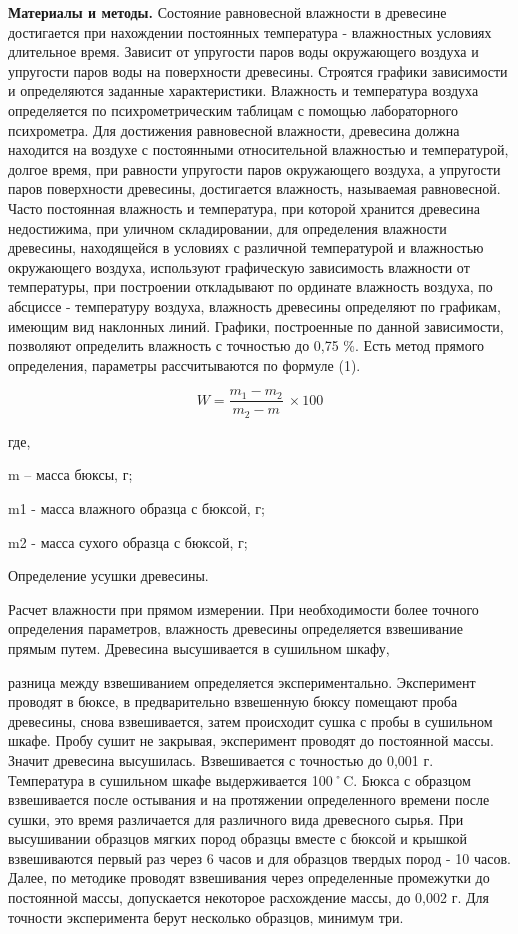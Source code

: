 \begin{multicols}{2}
{\bfseries Материалы и методы.} Состояние равновесной влажности в древесине
достигается при нахождении постоянных температура - влажностных условиях
длительное время. Зависит от упругости паров воды окружающего воздуха и
упругости паров воды на поверхности древесины. Строятся графики
зависимости и определяются заданные характеристики. Влажность и
температура воздуха определяется по психрометрическим таблицам с помощью
лабораторного психрометра. Для достижения равновесной влажности,
древесина должна находится на воздухе с постоянными относительной
влажностью и температурой, долгое время, при равности упругости паров
окружающего воздуха, а упругости паров поверхности древесины,
достигается влажность, называемая равновесной. Часто постоянная
влажность и температура, при которой хранится древесина недостижима, при
уличном складировании, для определения влажности древесины, находящейся
в условиях с различной температурой и влажностью окружающего воздуха,
используют графическую зависимость влажности от температуры, при
построении откладывают по ординате влажность воздуха, по абсциссе -
температуру воздуха, влажность древесины определяют по графикам, имеющим
вид наклонных линий. Графики, построенные по данной зависимости,
позволяют определить влажность с точностью до 0,75 \%. Есть метод
прямого определения, параметры рассчитываются по формуле (1).

\begin{equation}
W = \frac{m_{1} - m_{2}}{m_{2} - m}\  \times 100
\end{equation}

где,

m -- масса бюксы, г;

m1 - масса влажного образца с бюксой, г;

m2 - масса сухого образца с бюксой, г;

Определение усушки древесины.

Расчет влажности при прямом измерении. При необходимости более точного
определения параметров, влажность древесины определяется взвешивание
прямым путем. Древесина высушивается в сушильном шкафу,

разница между взвешиванием определяется экспериментально. Эксперимент
проводят в бюксе, в предварительно взвешенную бюксу помещают проба
древесины, снова взвешивается, затем происходит сушка с пробы в
сушильном шкафе. Пробу сушит не закрывая, эксперимент проводят до
постоянной массы. Значит древесина высушилась. Взвешивается с точностью
до 0,001 г. Температура в сушильном шкафе выдерживается 100˚C. Бюкса с
образцом взвешивается после остывания и на протяжении определенного
времени после сушки, это время различается для различного вида
древесного сырья. При высушивании образцов мягких пород образцы вместе с
бюксой и крышкой взвешиваются первый раз через 6 часов и для образцов
твердых пород - 10 часов. Далее, по методике проводят взвешивания через
определенные промежутки до постоянной массы, допускается некоторое
расхождение массы, до 0,002 г. Для точности эксперимента берут несколько
образцов, минимум три.


\end{multicols}
